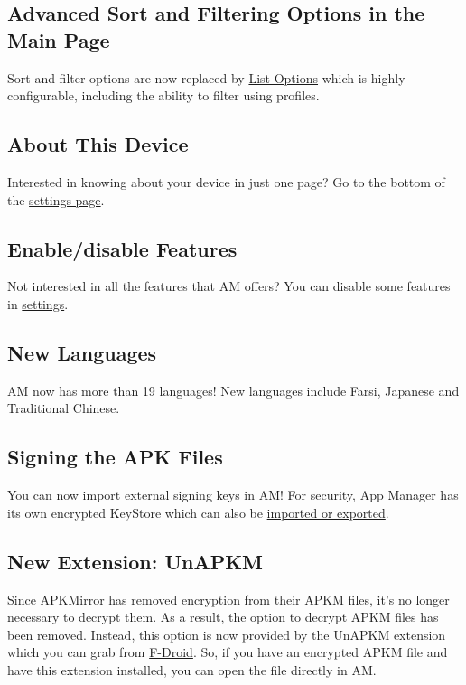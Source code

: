 \subsection{Advanced Sort and Filtering Options in the Main Page}
Sort and filter options are now replaced by \hyperref[subsubsec:main-list-options]{List Options} which is highly configurable,
including the ability to filter using profiles.

\subsection{About This Device}
Interested in knowing about your device in just one page?
Go to the bottom of the \hyperref[subsec:device-info]{settings page}.

\subsection{Enable/disable Features}
Not interested in all the features that AM offers?
You can disable some features in \hyperref[subsubsec:enable/disable-features]{settings}.

\subsection{New Languages}
AM now has more than 19 languages!
New languages include Farsi, Japanese and Traditional Chinese.

\subsection{Signing the APK Files}
You can now import external signing keys in AM! For security, App Manager has its own encrypted KeyStore which can also be \hyperref[subsubsec:import/export-keystore]{imported or exported}.

\subsection{New Extension: UnAPKM}
Since APKMirror has removed encryption from their APKM files, it's no longer necessary to decrypt them.
As a result, the option to decrypt APKM files has been removed.
Instead, this option is now provided by the UnAPKM extension which you can grab from \href{https://f-droid.org/packages/io.github.muntashirakon.unapkm/}{F-Droid}.
So, if you have an encrypted APKM file and have this extension installed, you can open the file directly in AM\@.


